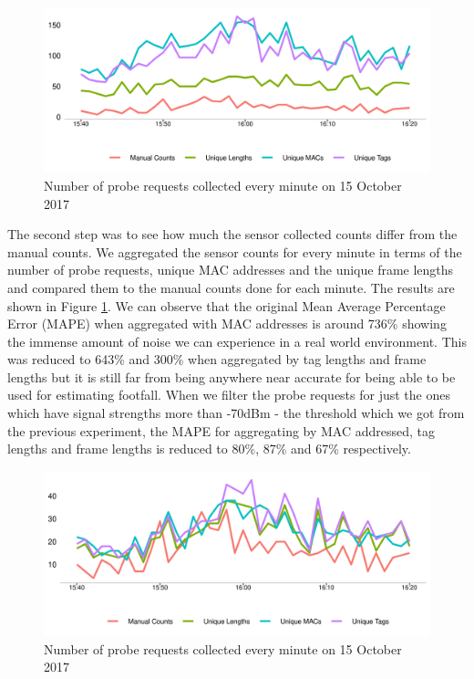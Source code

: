 \begin{figure}
  \includegraphics{images/ucl-comparison-before.png}
  \caption{Number of probe requests collected every minute on 15 October 2017}
  \label{figure:collection:ucl:before}
\end{figure}

The second step was to see how much the sensor collected counts differ from the manual counts.
We aggregated the sensor counts for every minute in terms of the number of probe requests, unique MAC addresses and the unique frame lengths and compared them to the manual counts done for each minute.
The results are shown in Figure \ref{figure:collection:ucl:before}.
We can observe that the original Mean Average Percentage Error (MAPE) when aggregated with MAC addresses is around 736\% showing the immense amount of noise we can experience in a real world environment.
This was reduced to 643\% and 300\% when aggregated by tag lengths and frame lengths but it is still far from being anywhere near accurate for being able to be used for estimating footfall.
When we filter the probe requests for just the ones which have signal strengths more than -70dBm - the threshold which we got from the previous experiment, the MAPE for aggregating by MAC addressed, tag lengths and frame lengths is reduced to 80\%, 87\% and 67\% respectively.

\begin{figure}
  \includegraphics{images/ucl-comparison-after.png}
  \caption{Number of probe requests collected every minute on 15 October 2017}
  \label{figure:collection:ucl:config}
\end{figure}

